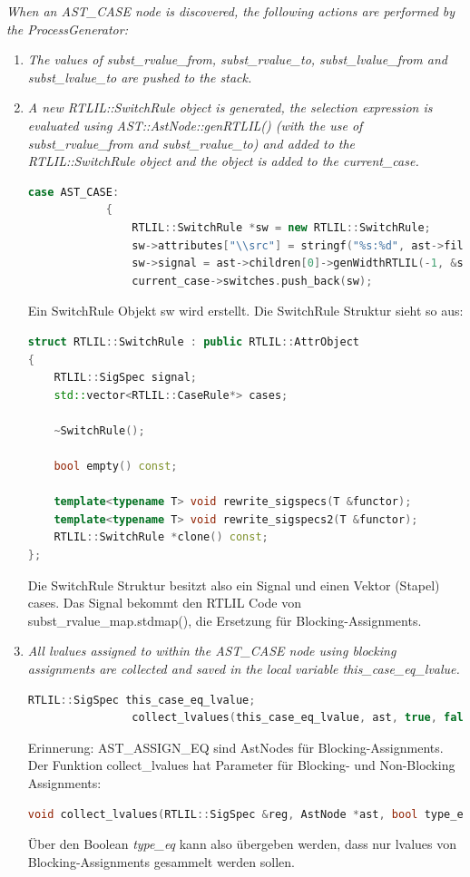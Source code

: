 \documentclass[11pt]{report}
\begin{document}
\textit{When an AST\_CASE node is discovered, the following actions are performed by the ProcessGenerator:}
\begin{enumerate}
  \item \textit{The values of subst\_rvalue\_from, subst\_rvalue\_to, subst\_lvalue\_from and subst\_lvalue\_to are pushed to the stack.}

  
\item \textit{A new RTLIL::SwitchRule object is generated, the selection expression is evaluated using AST::AstNode::genRTLIL() (with the use of subst\_rvalue\_from and subst\_rvalue\_to) and added to the RTLIL::SwitchRule object and the object is added to the current\_case.}
  \begin{lstlisting}[language=C++]
  	case AST_CASE:
			{
				RTLIL::SwitchRule *sw = new RTLIL::SwitchRule;
				sw->attributes["\\src"] = stringf("%s:%d", ast->filename.c_str(), ast->linenum);
				sw->signal = ast->children[0]->genWidthRTLIL(-1, &subst_rvalue_map.stdmap());
				current_case->switches.push_back(sw);
  \end{lstlisting}
  Ein SwitchRule Objekt sw wird erstellt.
  Die SwitchRule Struktur sieht so aus:
  \begin{lstlisting}[language=C++]
  	struct RTLIL::SwitchRule : public RTLIL::AttrObject
{
	RTLIL::SigSpec signal;
	std::vector<RTLIL::CaseRule*> cases;

	~SwitchRule();

	bool empty() const;

	template<typename T> void rewrite_sigspecs(T &functor);
	template<typename T> void rewrite_sigspecs2(T &functor);
	RTLIL::SwitchRule *clone() const;
};
  \end{lstlisting}
  Die SwitchRule Struktur besitzt also ein Signal und einen Vektor (Stapel) cases.
  Das Signal bekommt den RTLIL Code von subst\_rvalue\_map.stdmap(), die Ersetzung für Blocking-Assignments.

\item \textit{All lvalues assigned to within the AST\_CASE node using blocking assignments are collected and saved in the local variable this\_case\_eq\_lvalue.}
\begin{lstlisting}[language=C++]
RTLIL::SigSpec this_case_eq_lvalue;
				collect_lvalues(this_case_eq_lvalue, ast, true, false);
\end{lstlisting}
Erinnerung: AST\_ASSIGN\_EQ sind AstNodes für Blocking-Assignments.
Der Funktion collect\_lvalues hat Parameter für Blocking- und Non-Blocking Assignments:
\begin{lstlisting}[language=C++]
void collect_lvalues(RTLIL::SigSpec &reg, AstNode *ast, bool type_eq, bool type_le, bool run_sort_and_unify = true)
\end{lstlisting}
Über den Boolean \textit{type\_eq} kann also übergeben werden, dass nur lvalues von Blocking-Assignments gesammelt werden sollen. 



\end{enumerate}
\end{document}
